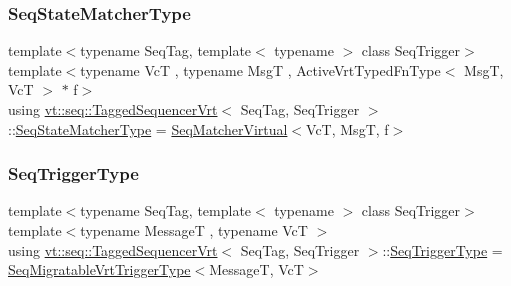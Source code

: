 \mbox{\label{structvt_1_1seq_1_1_tagged_sequencer_vrt_a631ea1df2eb19c0058aaf29f93950226}} 
\subsubsection{\texorpdfstring{Seq\+State\+Matcher\+Type}{SeqStateMatcherType}}
{\footnotesize\ttfamily template$<$typename Seq\+Tag, template$<$ typename $>$ class Seq\+Trigger$>$ \\
template$<$typename VcT , typename MsgT , Active\+Vrt\+Typed\+Fn\+Type$<$ Msg\+T, Vc\+T $>$ $\ast$ f$>$ \\
using \hyperlink{structvt_1_1seq_1_1_tagged_sequencer_vrt}{vt\+::seq\+::\+Tagged\+Sequencer\+Vrt}$<$ Seq\+Tag, Seq\+Trigger $>$\+::\hyperlink{structvt_1_1seq_1_1_tagged_sequencer_a8b215c5e7be7295118d6d0716f3a8052}{Seq\+State\+Matcher\+Type} =  \hyperlink{structvt_1_1seq_1_1_seq_matcher_virtual}{Seq\+Matcher\+Virtual}$<$VcT, MsgT, f$>$}

\mbox{\label{structvt_1_1seq_1_1_tagged_sequencer_vrt_a04f34e1c279e29fd32af152ccf8dcf99}} 
\subsubsection{\texorpdfstring{Seq\+Trigger\+Type}{SeqTriggerType}}
{\footnotesize\ttfamily template$<$typename Seq\+Tag, template$<$ typename $>$ class Seq\+Trigger$>$ \\
template$<$typename MessageT , typename VcT $>$ \\
using \hyperlink{structvt_1_1seq_1_1_tagged_sequencer_vrt}{vt\+::seq\+::\+Tagged\+Sequencer\+Vrt}$<$ Seq\+Tag, Seq\+Trigger $>$\+::\hyperlink{structvt_1_1seq_1_1_tagged_sequencer_a4b015f2f7d3197a66af5576f0e63a834}{Seq\+Trigger\+Type} =  \hyperlink{namespacevt_1_1seq_a4147691d837ca54f178a5f1c49effc6f}{Seq\+Migratable\+Vrt\+Trigger\+Type}$<$MessageT, VcT$>$}

